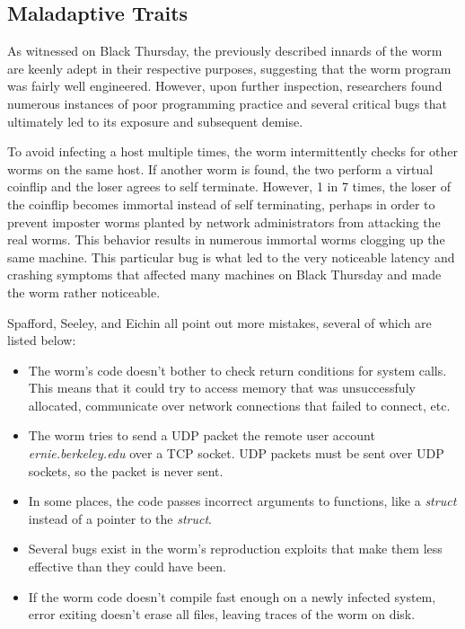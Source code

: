 \subsection*{Maladaptive Traits}
As witnessed on Black Thursday, the previously described innards of the worm are
keenly adept in their respective purposes, suggesting that the worm program was
fairly well engineered. However, upon further inspection, researchers found
numerous instances of poor programming practice and several critical
bugs that ultimately led to its exposure and subsequent demise.

To avoid infecting a host multiple times, the worm 
intermittently checks for other worms on the same host. If another worm is
found, the two perform a virtual coinflip and the loser agrees to self
terminate.
However, 1 in 7 times, the loser of the coinflip becomes immortal instead of
self terminating, perhaps in order to prevent imposter worms planted by network
administrators from attacking the real worms\cite{spafford_internet_1989}.
This behavior results in
numerous immortal worms clogging up the same machine. This particular bug is
what led to the very noticeable latency and crashing symptoms that affected many
machines on Black Thursday and made the worm rather noticeable.

Spafford\cite{spafford_internet_1989}, Seeley\cite{seeley_tour_1989}, and
Eichin\cite{eichin_microscope_1989} all point out more mistakes, several of
which are listed below:
\begin{itemize}
\item The worm's code doesn't bother to check return conditions for system
calls. This means that it could try to access memory that was
unsuccessfuly allocated, communicate over network connections that failed to
connect, etc. 
\item The worm tries to send a UDP packet the remote user account
\textit{ernie.berkeley.edu} over a TCP socket. UDP packets must be sent
over UDP sockets, so the packet is never sent.
\item In some places, the code passes incorrect arguments to functions, like a
\textit{struct} instead of a pointer to the \textit{struct}.
\item Several bugs exist in the worm's reproduction exploits that make them
less effective than they could have been. 
\item If the worm code doesn't compile fast enough on a newly infected system,
error exiting doesn't erase all files, leaving traces of the worm on
disk.
\end{itemize}


